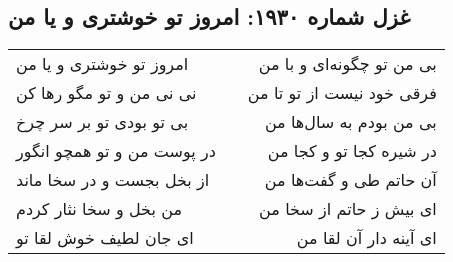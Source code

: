 \begin{center}
\section*{غزل شماره ۱۹۳۰: امروز تو خوشتری و یا من}
\label{sec:1930}
\begin{longtable}{l p{0.5cm} r}
امروز تو خوشتری و یا من
&&
بی من تو چگونه‌ای و با من
\\
نی نی من و تو مگو رها کن
&&
فرقی خود نیست از تو تا من
\\
بی تو بودی تو بر سر چرخ
&&
بی من بودم به سال‌ها من
\\
در پوست من و تو همچو انگور
&&
در شیره کجا تو و کجا من
\\
از بخل بجست و در سخا ماند
&&
آن حاتم طی و گفت‌ها من
\\
من بخل و سخا نثار کردم
&&
ای بیش ز حاتم از سخا من
\\
ای جان لطیف خوش لقا تو
&&
ای آینه دار آن لقا من
\\
\end{longtable}
\end{center}
